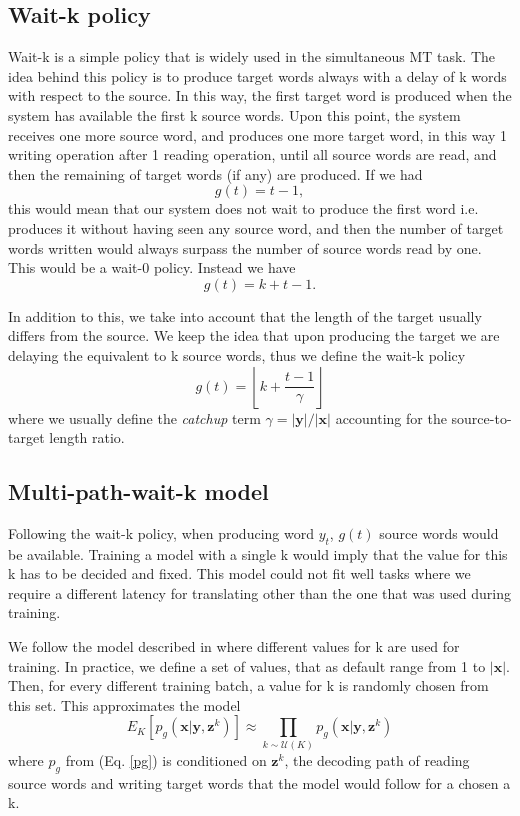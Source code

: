 \documentclass[11pt,english,listoffigures,listoftables]{tfgetsinf}
\newcommand{\vect}[1]{\mathbf{#1}}
\begin{document}
\subsection{Wait-k policy}
Wait-k is a simple policy that is widely used in the simultaneous MT task.
The idea behind this policy is to produce target words always with a delay of k words with respect to the source. In this way, the first target word is produced when the system has available the first k source words. Upon this point, the system receives one more source word, and produces one more target word, in this way 1 writing operation after 1 reading operation, until all source words are read, and then the remaining of target words (if any) are produced.
If we had 
\begin{equation}
g(t) = t - 1, 
\end{equation}
this would mean that our system does not wait to produce the first word i.e. produces it without having seen any source word, and then the number of target words written would always surpass the number of source words read by one. This would be a wait-0 policy. Instead we have
\begin{equation}
g(t) = k + t - 1.
\end{equation}

In addition to this, we take into account that the length of the target usually differs from the source. We keep the idea that upon producing the target we are delaying the equivalent to k source words, thus we define the wait-k policy 
\begin{equation}\label{waitkgamma}
    g(t) = \left\lfloor k + \frac{t - 1}{\gamma}\right\rfloor 
\end{equation}
where we usually define the \textit{catchup} term $\gamma = |\vect{y}|/|\vect{x}|$ accounting for the source-to-target length ratio.


\subsection{Multi-path-wait-k model}\label{multik}
Following the wait-k policy, when producing word $y_t$, $g(t)$ source words would be available.
Training a model with a single k would imply that the value for this k has to be decided and fixed. This model could not fit well tasks where we require a different latency for translating other than the one that was used during training.

We follow the model described in \cite{DBLP:journals/corr/abs-2005-08595} where different values for k are used for training. In practice, we define a set of values, that as default range from 1 to $|\vect{x}|$. Then, for every different training batch, a value for k is randomly chosen from this set. This approximates the model
\begin{equation}
    E_K\left[ p_g(\vect{x} | \vect{y}, \vect{z}^k) \right] \approx \prod_{k\sim \mathcal{U}(K)} p_g(\vect{x} | \vect{y}, \vect{z}^k)
\end{equation}
where $p_g$ from (Eq. \ref{pg}) is conditioned on $\vect{z}^k$, the decoding path of reading source words and writing target words that the model would follow for a chosen a k.
\end{document}
